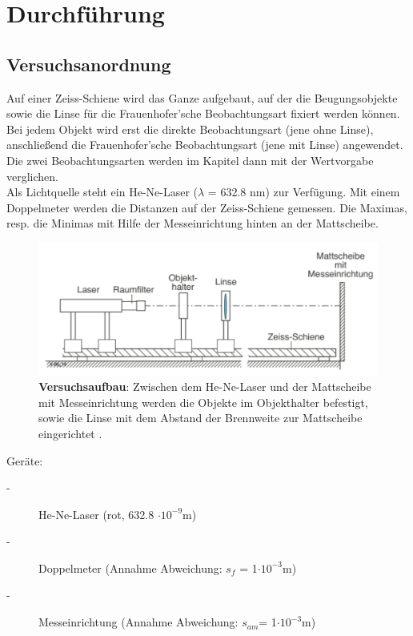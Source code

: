 \chapter{Durchführung}
\thispagestyle{fancy}
\section{Versuchsanordnung}
Auf einer Zeiss-Schiene wird das Ganze aufgebaut, auf der die Beugungsobjekte sowie die Linse für die Frauenhofer’sche Beobachtungsart fixiert werden können. Bei jedem Objekt wird erst die direkte Beobachtungsart (jene ohne Linse), anschließend die Frauenhofer’sche Beobachtungsart (jene mit Linse) angewendet. Die zwei Beobachtungsarten werden im Kapitel  dann mit der Wertvorgabe verglichen.
\\[0.5cm]
Als Lichtquelle steht ein He-Ne-Laser ($\lambda$ = 632.8 nm) zur Verfügung. Mit einem Doppelmeter werden die Distanzen auf der Zeiss-Schiene gemessen. Die Maximas, resp. die Minimas mit Hilfe der Messeinrichtung hinten an der Mattscheibe.\\
\begin{figure}[h]
\begin{center}
\includegraphics[width=\textwidth]{Bilder/Versuchsaufbau.png}
\end{center}
\caption[Versuchsaufbau]{\textbf{Versuchsaufbau}: Zwischen dem He-Ne-Laser und der Mattscheibe mit Messeinrichtung werden die Objekte im Objekthalter befestigt, sowie die Linse mit dem Abstand der Brennweite zur Mattscheibe eingerichtet \cite{TechnikFHNW2014}.}
\label{fig:Versuchsaufbau}
\end{figure}

\noindent
Geräte:
\begin{description}
\item[-]
He-Ne-Laser (rot, 632.8 $\cdot10^{-9}$m)
\item[-]
Doppelmeter (Annahme Abweichung: $s_{f}$ = 1$\cdot10^{-3}$m)
\item[-]
Messeinrichtung (Annahme Abweichung: $s_{a{m}}$= 1$\cdot10^{-3}$m)
\end{description}
\newpage


